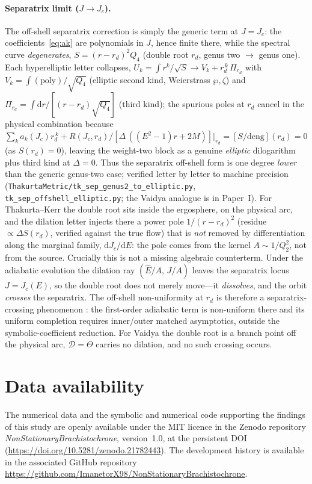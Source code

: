 \documentclass[12pt]{iopart}
\theoremstyle{plain}
\theoremstyle{definition}
\theoremstyle{remark}
\newcommand{\Ehat}{\hat E}
\newcommand{\Jc}{J_{c}}
\newcommand{\dd}{\mathrm{d}}
\begin{document}
\paragraph{Separatrix limit ($J\to\Jc$).} The off-shell separatrix correction is simply
the generic term at $J=\Jc$: the coefficients~\eqref{eq:ak} are polynomials in $J$, hence
finite there, while the spectral curve \emph{degenerates}, $S=(r-r_d)^2Q_4$ (double root
$r_d$, genus two $\to$ genus one). Each hyperelliptic letter collapses,
$U_k=\int r^k/\sqrt S\to V_k+r_d^{\,k}\,\Pi_{r_d}$ with $V_k=\int(\text{poly})/\sqrt{Q_4}$
(elliptic second kind, Weierstrass $\wp,\zeta$) and $\Pi_{r_d}=\int\dd r/[(r-r_d)\sqrt{Q_4}]$
(third kind); the spurious poles at $r_d$ cancel in the physical combination because
$\sum_k a_k(\Jc)r_d^{\,k}+R(\Jc,r_d)/[\Delta\,((E^2-1)r+2M)]|_{r_d}=[S/\text{deng}](r_d)=0$
(as $S(r_d)=0$), leaving the weight-two block as a genuine \emph{elliptic}
dilogarithm~\cite{BeilinsonLevin1994,BrownLevin2011} plus third kind at $\Delta=0$. Thus
the separatrix off-shell form is one degree \emph{lower} than the generic genus-two case;
verified letter by letter to machine precision (\texttt{ThakurtaMetric/tk\_sep\_genus2\_to\_elliptic.py},
\texttt{tk\_sep\_offshell\_elliptic.py}; the Vaidya analogue is in Paper~I).
For Thakurta--Kerr the double root sits inside the ergosphere, on the physical arc, and
the dilation letter injects there a power pole $1/(r-r_d)^2$ (residue
$\propto\Delta S(r_d)$, verified against the true flow) that is \emph{not} removed by
differentiation along the marginal family, $\dd J_c/\dd E$: the pole comes from the kernel $A\sim1/Q_2^2$, not
from the source. Crucially this is not a missing algebraic counterterm. Under the
adiabatic evolution the dilation ray $(\Ehat/A,\,J/A)$ leaves the separatrix locus
$J=J_c(E)$, so the double root does not merely move---it \emph{dissolves}, and the orbit
\emph{crosses} the separatrix. The off-shell non-uniformity at $r_d$ is therefore a
separatrix-crossing phenomenon \cite{Neishtadt1987,Neishtadt2013}: the first-order
adiabatic term is non-uniform there and its uniform completion requires inner/outer
matched asymptotics, outside the symbolic-coefficient reduction. For Vaidya the double
root is a branch point off the physical arc, $\mathcal D=\Theta$ carries no dilation,
and no such crossing occurs.



\clearpage


\section*{Data availability}
The numerical data and the symbolic and numerical code supporting the findings of this
study are openly available under the MIT licence in the Zenodo repository
\emph{NonStationaryBrachistochrone}, version~1.0, at the persistent
DOI~\cite{Rosignoli2026Code} (\url{https://doi.org/10.5281/zenodo.21782443}). The
development history is available in the associated GitHub repository
\url{https://github.com/ImanetorX98/NonStationaryBrachistochrone}.
\end{document}
